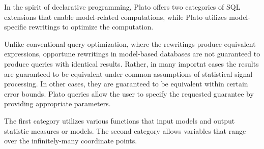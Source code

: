 In the spirit of declarative programming, Plato offers two categories of SQL extensions that enable model-related computations, while Plato utilizes model-specific rewritings to optimize the computation. 

Unlike conventional query optimization, where the rewritings produce equivalent expressions, opportune rewritings in model-based databases are not guaranteed to produce queries with identical results. Rather, in many importnt cases the results are guaranteed to be equivalent under common assumptions of statistical signal processing. In other cases, they are guaranteed to be equivalent within certain error bounds. Plato queries allow the user to specify the requested guarantee by providing appropriate parameters.

The first category utilizes various functions that input models and output statistic measures or models. The second category allows variables that range over the infinitely-many coordinate points. 


